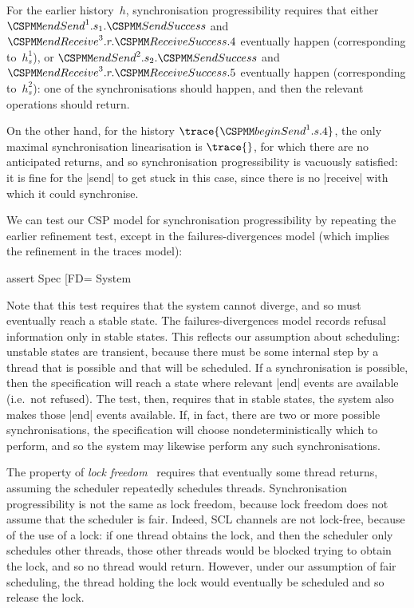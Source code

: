 For the earlier history~$h$, synchronisation progressibility requires that
either $\endSend^1.s_1.\SendSuccess$ and $\endReceive^3.r.\ReceiveSuccess.4$
eventually happen (corresponding to~$h_s^1$), or $\endSend^2.s_2.\SendSuccess$
and $\endReceive^3.r.\ReceiveSuccess.5$ eventually happen (corresponding
to~$h_s^2$): one of the synchronisations should happen, and then the relevant
operations should return.

On the other hand, for the history $\trace{\beginSend^1.s.4}$, the only
maximal synchronisation linearisation is $\trace{}$, for which there are no
anticipated returns, and so synchronisation progressibility is vacuously
satisfied: it is fine for the |send| to get stuck in this case, since there is
no |receive| with which it could synchronise.



We can test our CSP model for synchronisation progressibility by repeating the
earlier refinement test, except in the failures-divergences model (which
implies the refinement in the traces model):
%
\begin{cspm}
assert Spec [FD= System
\end{cspm}
%
Note that this test requires that the system cannot diverge, and so must
eventually reach a stable state.  The failures-divergences model records
refusal information only in stable states.  This reflects our assumption about
scheduling: unstable states are transient, because there must be some internal
step by a thread that is possible and that will be scheduled.  If a
synchronisation is possible, then the specification will reach a state where
relevant |end| events are available (i.e.~not refused).  The test, then,
requires that in stable states, the system also makes those |end| events
available.  If, in fact, there are two or more possible synchronisations, the
specification will choose nondeterministically which to perform, and so the
system may likewise perform any such synchronisations.

The property of \emph{lock freedom}~\cite{Herlihy-Shavit} requires that
eventually some thread returns, assuming the scheduler repeatedly schedules
threads.  Synchronisation progressibility is not the same as lock freedom,
because lock freedom does not assume that the scheduler is fair.  Indeed, SCL
channels are not lock-free, because of the use of a lock: if one thread
obtains the lock, and then the scheduler only schedules other threads, those
other threads would be blocked trying to obtain the lock, and so no thread
would return.  However, under our assumption of fair scheduling, the thread
holding the lock would eventually be scheduled and so release the lock.

